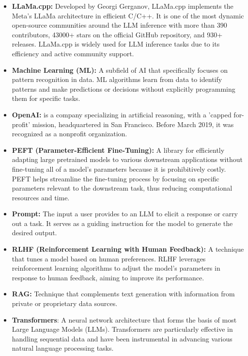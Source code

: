 \begin{itemize}
\item \textbf{LLaMa.cpp:} Developed by Georgi Gerganov, LLaMa.cpp implements the Meta's LLaMa architecture in efficient C/C++. It is one of the most dynamic open-source communities around the LLM inference with more than 390 contributors, 43000+ stars on the official GitHub repository, and 930+ releases. LLaMa.cpp is widely used for LLM inference tasks due to its efficiency and active community support.

\item \textbf{Machine Learning (ML):} A subfield of AI that specifically focuses on pattern recognition in data. ML algorithms learn from data to identify patterns and make predictions or decisions without explicitly programming them for specific tasks.
\item \textbf{OpenAI:} is a company specializing in artificial reasoning, with a 'capped for-profit' mission, headquartered in San Francisco. Before March 2019, it was recognized as a nonprofit organization.
\item \textbf{PEFT (Parameter-Efficient Fine-Tuning):} A library for efficiently adapting large pretrained models to various downstream applications without fine-tuning all of a model’s parameters because it is prohibitively costly. PEFT helps streamline the fine-tuning process by focusing on specific parameters relevant to the downstream task, thus reducing computational resources and time.

\item \textbf{Prompt:} The input a user provides to an LLM to elicit a response or carry out a task. It serves as a guiding instruction for the model to generate the desired output.

\item \textbf{RLHF (Reinforcement Learning with Human Feedback):} A technique that tunes a model based on human preferences. RLHF leverages reinforcement learning algorithms to adjust the model's parameters in response to human feedback, aiming to improve its performance.

\item \textbf{RAG:} Technique that complements text generation with information from private or proprietary data sources.

\item \textbf{Transformers}: A neural network architecture that forms the basis of most Large Language Models (LLMs). Transformers are particularly effective in handling sequential data and have been instrumental in advancing various natural language processing tasks.



\end{itemize}

